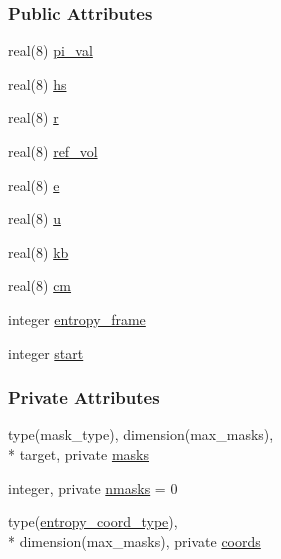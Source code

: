 \subsubsection*{Public Attributes}
\begin{DoxyCompactItemize}
\item 
real(8) \hyperlink{classcalc__entropy_ace4e0d6c83bde96c914718bedb3d95b6}{pi\-\_\-val}
\item 
real(8) \hyperlink{classcalc__entropy_a365c453093f33984755407e59cd2b03f}{hs}
\item 
real(8) \hyperlink{classcalc__entropy_a254c581937b3c10459355e8b4ee78169}{r}
\item 
real(8) \hyperlink{classcalc__entropy_a5d2d8c2c9a3880bcf294eeb9c9e59990}{ref\-\_\-vol}
\item 
real(8) \hyperlink{classcalc__entropy_ae17fb9f97d704cb0eb48b1c7b7b0ccaa}{e}
\item 
real(8) \hyperlink{classcalc__entropy_ab98127dc795d8a07522c22aff868c11b}{u}
\item 
real(8) \hyperlink{classcalc__entropy_a535551365a6e86ba63b99605509d12d8}{kb}
\item 
real(8) \hyperlink{classcalc__entropy_a849ddf2db70a1dd6e4098d51b05f195f}{cm}
\item 
integer \hyperlink{classcalc__entropy_a530d9ffe62a5dde36d2b21a72da0be95}{entropy\-\_\-frame}
\item 
integer \hyperlink{classcalc__entropy_a956e6d4e2fc8c2d4dbc414d534e5c49d}{start}
\end{DoxyCompactItemize}
\subsubsection*{Private Attributes}
\begin{DoxyCompactItemize}
\item 
type(mask\-\_\-type), dimension(max\-\_\-masks), \\*
target, private \hyperlink{classcalc__entropy_aec8b2f5549506f769e3281da73e1e70d}{masks}
\item 
integer, private \hyperlink{classcalc__entropy_a65df17917d4604d8aff01d32b1d9d2c2}{nmasks} = 0
\item 
type(\hyperlink{structcalc__entropy_1_1entropy__coord__type}{entropy\-\_\-coord\-\_\-type}), \\*
dimension(max\-\_\-masks), private \hyperlink{classcalc__entropy_a146c2e38467ec52f4c216e2a18b5aaa1}{coords}
\end{DoxyCompactItemize}


